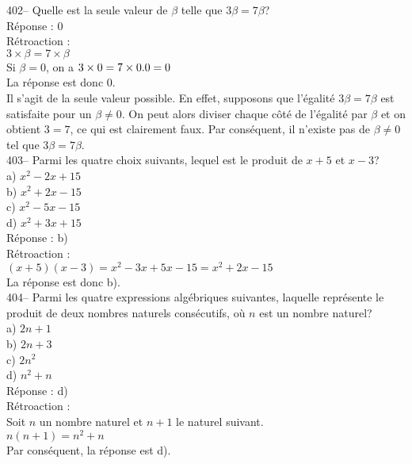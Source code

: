﻿\documentclass[letterpaper, 12pt]{article}
\begin{document}
402-- Quelle est la seule valeur de $\beta$ telle que $3\beta=7\beta$?\\

R\'eponse : 0 \\

R\'etroaction : \\
$3\times \beta = 7 \times \beta $\\
Si $\beta=0$, on a $3\times0=7\times 0.\\
0=0$\\
La r\'eponse est donc 0.\\

Il s'agit de la seule valeur possible.  En effet, supposons que
l'\'egalit\'e $3\beta=7\beta$ est satisfaite pour un $\beta\neq0$.  On peut
alors diviser chaque c\^ot\'e de l'\'egalit\'e par $\beta$ et on obtient
$3=7$, ce qui est clairement faux.  Par cons\'equent, il n'existe pas de
$\beta\neq0$ tel que $3\beta=7\beta$.\\

403-- Parmi les quatre choix suivants, lequel est le produit de $ x+5$ et
$x-3$?\\
a) $x^{2}-2x+15$ \\
b) $x^{2}+2x-15$\\
c) $x^{2}-5x-15$\\
d) $x^{2}+3x+15$\\

R\'eponse : b)\\

R\'etroaction : \\
$\left( x+5\right) \left( x-3\right)=x^{2}-3x+5x-15=x^{2}+2x-15$\\
La r\'eponse est donc b).\\

404-- Parmi les quatre expressions alg\'ebriques suivantes, laquelle
repr\'esente le produit de deux nombres naturels cons\'ecutifs, o\`u $n$ est
un nombre naturel?\\
a) $2n+1$\\
b) $2n+3$ \\
c) $2n^{2}$\\
d) $n^{2}+n$\\

R\'eponse : d)\\

R\'etroaction : \\
Soit $n$ un nombre naturel et $n+1$ le naturel suivant.\\
$n\left( n+1\right)=n^{2}+n$ \\
Par cons\'equent, la r\'eponse est d).\\
\end{document}
